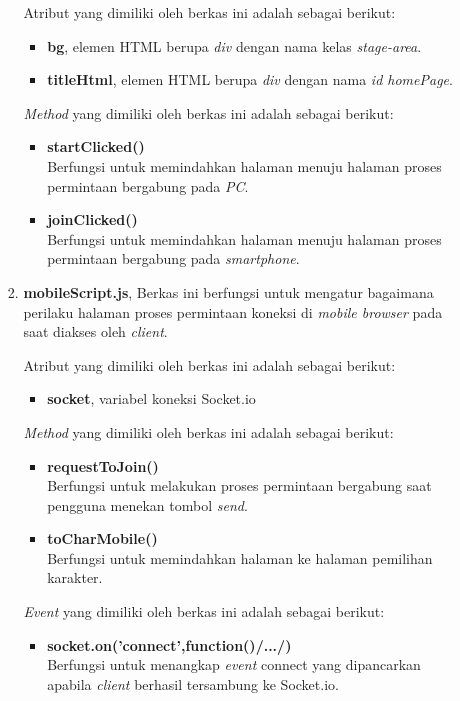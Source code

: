 \begin{enumerate}
\begin{enumerate}
\begin{enumerate}
			Atribut yang dimiliki oleh berkas ini adalah sebagai berikut:
			\begin{itemize}
				\item \textbf{bg}, elemen HTML berupa \textit{div} dengan nama kelas \textit{stage-area}.
				\item \textbf{titleHtml}, elemen HTML berupa \textit{div} dengan nama \textit{id homePage}.
			\end{itemize}
			
			\textit{Method} yang dimiliki oleh berkas ini adalah sebagai berikut:
			\begin{itemize}
				\item \textbf{startClicked()} \\
				Berfungsi untuk memindahkan halaman menuju halaman proses permintaan bergabung pada \textit{PC}.
				
				\item \textbf{joinClicked()} \\
				Berfungsi untuk memindahkan halaman menuju halaman proses permintaan bergabung pada \textit{smartphone}.
			\end{itemize}
			
			\item \textbf{mobileScript.js}, Berkas ini berfungsi untuk mengatur bagaimana perilaku halaman proses permintaan koneksi di \textit{mobile browser} pada saat diakses oleh \textit{client}.
			
			Atribut yang dimiliki oleh berkas ini adalah sebagai berikut:
			\begin{itemize}
				\item \textbf{socket}, variabel koneksi Socket.io
			\end{itemize}
			
			\textit{Method} yang dimiliki oleh berkas ini adalah sebagai berikut:
			\begin{itemize}
				\item \textbf{requestToJoin()} \\ 
				Berfungsi untuk melakukan proses permintaan bergabung saat pengguna menekan tombol \textit{send}.
				
				\item \textbf{toCharMobile()} \\
				Berfungsi untuk memindahkan halaman ke halaman pemilihan karakter.
			\end{itemize}
			
			\textit{Event} yang dimiliki oleh berkas ini adalah sebagai berikut:
			\begin{itemize}
				\item \textbf{socket.on('connect',function()/{.../})} \\
				Berfungsi untuk menangkap \textit{event} connect yang dipancarkan apabila \textit{client} berhasil tersambung ke Socket.io.
				

\end{itemize}
\end{enumerate}
\end{enumerate}
\end{enumerate}
